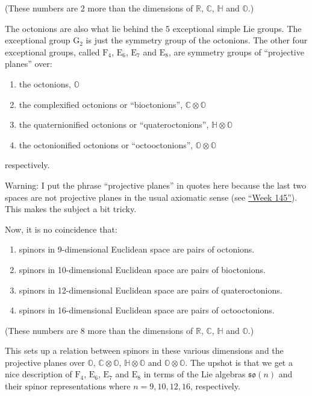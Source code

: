 \documentclass{article}
\def\tightlist{}
\begin{document}
(These numbers are 2 more than the dimensions of \(\mathbb{R}\),
\(\mathbb{C}\), \(\mathbb{H}\) and \(\mathbb{O}\).)

The octonions are also what lie behind the 5 exceptional simple Lie
groups. The exceptional group \(\mathrm{G}_2\) is just the symmetry
group of the octonions. The other four exceptional groups, called
\(\mathrm{F}_4\), \(\mathrm{E}_6\), \(\mathrm{E}_7\) and
\(\mathrm{E}_8\), are symmetry groups of ``projective planes'' over:

\begin{enumerate}
\def\labelenumi{\arabic{enumi})}
\tightlist
\item
  the octonions, \(\mathbb{O}\)
\item
  the complexified octonions or ``bioctonions'',
  \(\mathbb{C}\otimes\mathbb{O}\)
\item
  the quaternionified octonions or ``quateroctonions'',
  \(\mathbb{H}\otimes\mathbb{O}\)
\item
  the octonionified octonions or ``octooctonions'',
  \(\mathbb{O}\otimes\mathbb{O}\)
\end{enumerate}

respectively.

Warning: I put the phrase ``projective planes'' in quotes here because
the last two spaces are not projective planes in the usual axiomatic
sense (see \protect\hyperlink{week145}{``Week 145''}). This makes the
subject a bit tricky.

Now, it is no coincidence that:

\begin{enumerate}
\def\labelenumi{\arabic{enumi})}
\tightlist
\item
  spinors in 9-dimensional Euclidean space are pairs of octonions.
\item
  spinors in 10-dimensional Euclidean space are pairs of bioctonions.
\item
  spinors in 12-dimensional Euclidean space are pairs of
  quateroctonions.
\item
  spinors in 16-dimensional Euclidean space are pairs of octooctonions.
\end{enumerate}

(These numbers are 8 more than the dimensions of \(\mathbb{R}\),
\(\mathbb{C}\), \(\mathbb{H}\) and \(\mathbb{O}\).)

This sets up a relation between spinors in these various dimensions and
the projective planes over \(\mathbb{O}\),
\(\mathbb{C}\otimes\mathbb{O}\), \(\mathbb{H}\otimes\mathbb{O}\) and
\(\mathbb{O}\otimes\mathbb{O}\). The upshot is that we get a nice
description of \(\mathrm{F}_4\), \(\mathrm{E}_6\), \(\mathrm{E}_7\) and
\(\mathrm{E}_8\) in terms of the Lie algebras \(\mathfrak{so}(n)\) and
their spinor representations where \(n = 9, 10, 12, 16\), respectively.
\end{document}
